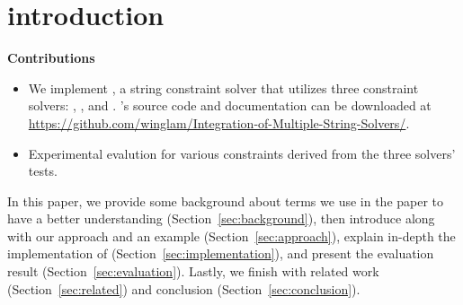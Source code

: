 \section{introduction}
\label{sec:introduction}

\textbf{Contributions}
\begin{itemize}
    \item We implement \imss, a string constraint solver that utilizes three constraint solvers:
    \hampi, \dprle, and \zstr. \imss's source code and documentation can be downloaded at
    \url{https://github.com/winglam/Integration-of-Multiple-String-Solvers/}.
    \item Experimental evalution for various constraints derived from the three solvers' tests.
\end{itemize}

In this paper, we provide some background about terms we use in the paper to have
a better understanding (Section~\ref{sec:background}), then introduce \imss along with
our approach and an example (Section~\ref{sec:approach}), explain in-depth the
implementation of \imss (Section~\ref{sec:implementation}), and present the evaluation
result (Section~\ref{sec:evaluation}). Lastly, we finish with related work
(Section~\ref{sec:related}) and conclusion (Section~\ref{sec:conclusion}).
